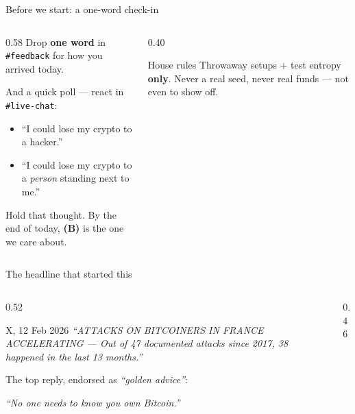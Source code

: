 \documentclass[aspectratio=169,11pt]{beamer}
\begin{document}

\begin{frame}{Before we start: a one-word check-in}
  \begin{columns}[T]
    \begin{column}{0.58\textwidth}
      Drop \textbf{one word} in \texttt{\#feedback} for how you arrived today.
      \vspace{8pt}

      And a quick poll --- react in \texttt{\#live-chat}:
      \begin{itemize}
        \item[\textbf{\color{accent}(A)}] ``I could lose my crypto to a hacker.''
        \item[\textbf{\color{btccol}(B)}] ``I could lose my crypto to a \emph{person} standing next to me.''
      \end{itemize}
      \vspace{6pt}
      Hold that thought. By the end of today, \textbf{\color{btccol}(B)} is the one we care about.
    \end{column}
    \begin{column}{0.40\textwidth}
      \begin{block}{House rules}
        \footnotesize
        Throwaway setups + test entropy \textbf{only}. Never a real seed, never
        real funds --- not even to show off.
      \end{block}
    \end{column}
  \end{columns}
\end{frame}

\begin{frame}{The headline that started this}
  \begin{columns}[T]
    \begin{column}{0.52\textwidth}
      \begin{block}{X, 12 Feb 2026}
        \footnotesize\itshape
        ``ATTACKS ON BITCOINERS IN FRANCE ACCELERATING --- Out of 47 documented
        attacks since 2017, 38 happened in the last 13 months.''
      \end{block}
      \vspace{4pt}
      The top reply, endorsed as \emph{``golden advice''}:
      \begin{block}{}
        \footnotesize\itshape ``No one needs to know you own Bitcoin.''
      \end{block}
    \end{column}
    \begin{column}{0.46\textwidth}
    \end{column}
  \end{columns}
\end{frame}
\end{document}

